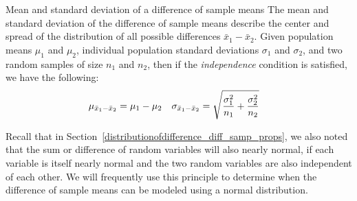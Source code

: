 \begin{onebox}{Mean and standard deviation of a difference of sample means}
The mean and standard deviation of the difference of sample means describe the center and spread of the distribution of all possible differences $\bar{x}_1-\bar{x}_2$.
Given population means $\mu_1$ and $\mu_2$, individual population
standard deviations $\sigma_1$ and $\sigma_2$, and two random samples
of size $n_1$ and $n_2$, then if the \emph{independence} condition
is satisfied, we have the following:
\begin{align*}
\mu_{\bar{x}_1 - \bar{x}_2} &= \mu_1 - \mu_2
	& \sigma_{\bar{x}_1 - \bar{x}_2}&=  \sqrt{\frac{\sigma_1^2}{n_1} + \frac{\sigma_2^2}{n_2}}
\vspace{1mm}
\end{align*}
\end{onebox}

Recall that in Section~\ref{distributionofdifference_diff_samp_props},
we also noted that the sum or difference of random variables will also
nearly normal, if each variable is itself nearly normal and the two
random variables are also independent of each other.
We will frequently use this principle to determine when the difference
of sample means can be modeled using a normal distribution.


